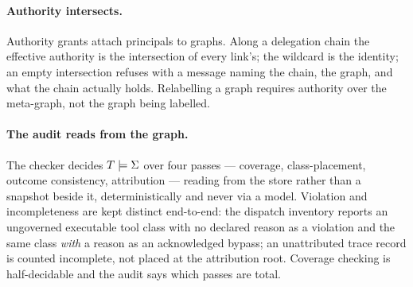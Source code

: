 \paragraph{Authority intersects.}
Authority grants attach principals to graphs. Along a delegation chain
the effective authority is the intersection of every link's; the
wildcard is the identity; an empty intersection refuses with a message
naming the chain, the graph, and what the chain actually holds.
Relabelling a graph requires authority over the meta-graph, not the
graph being labelled.

\paragraph{The audit reads \Sig from the graph.}
The checker decides $T \models \Sigma$ over four passes --- coverage,
class-placement, outcome consistency, attribution --- reading \Sig from
the store rather than a snapshot beside it, deterministically and
never via a model. Violation and incompleteness are kept distinct
end-to-end: the dispatch inventory reports an ungoverned executable
tool class with no declared reason as a violation and the same class
\emph{with} a reason as an acknowledged bypass; an unattributed trace
record is counted incomplete, not placed at the attribution root.
Coverage checking is half-decidable and the audit says which passes
are total.
